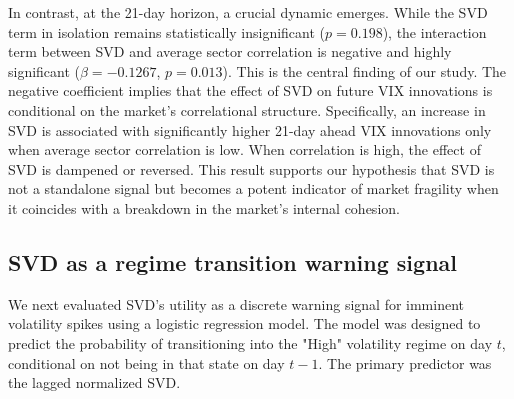 \documentclass[]{article}
\begin{document}
\begin{table}[t]
\centering
\caption{OLS Regression of Future VIX Log-Returns}
\label{tab:ols_results}
\end{table}

In contrast, at the 21-day horizon, a crucial dynamic emerges. While the SVD term in isolation remains statistically insignificant ($p = 0.198$), the interaction term between SVD and average sector correlation is negative and highly significant ($\beta = -0.1267$, $p = 0.013$). This is the central finding of our study. The negative coefficient implies that the effect of SVD on future VIX innovations is conditional on the market's correlational structure. Specifically, an increase in SVD is associated with significantly higher 21-day ahead VIX innovations only when average sector correlation is low. When correlation is high, the effect of SVD is dampened or reversed. This result supports our hypothesis that SVD is not a standalone signal but becomes a potent indicator of market fragility when it coincides with a breakdown in the market's internal cohesion.

\subsection{SVD as a regime transition warning signal}
We next evaluated SVD's utility as a discrete warning signal for imminent volatility spikes using a logistic regression model. The model was designed to predict the probability of transitioning into the "High" volatility regime on day $t$, conditional on not being in that state on day $t-1$. The primary predictor was the lagged normalized SVD.
\end{document}
